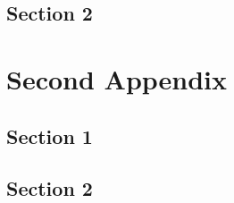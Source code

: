   \section{Section 2}\label{sec:App1Sec2}
    \lipsum[38]

\chapter{Second Appendix}\label{app:App2}
  \section{Section 1}\label{sec:App2Sec1}
    \lipsum[34-36]
  \section{Section 2}\label{sec:App2Sec2}
    \lipsum[38]






